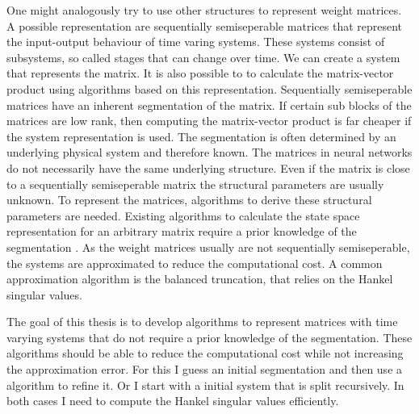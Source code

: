 \documentclass[doctype=mastersthesis,BCOR=15mm,biblatex]{ldvbook}%
\begin{document}
One might analogously try to use other structures to represent weight matrices.
A possible representation are sequentially semiseperable matrices that represent the input-output behaviour of time varing systems.
These systems consist of subsystems, so called stages that can change over time.
We can create a system that represents the matrix.
It is also possible to to calculate the matrix-vector product using algorithms based on this representation.
Sequentially semiseperable matrices have an inherent segmentation of the matrix.
If certain sub blocks of the matrices are low rank, then computing the matrix-vector product is far cheaper if the system representation is used.
The segmentation is often determined by an underlying physical system and therefore known. 
The matrices in neural networks do not necessarily have the same underlying structure.
Even if the matrix is close to a sequentially semiseperable matrix the structural parameters are usually unknown.
To represent the matrices, algorithms to derive these structural parameters are needed.
Existing algorithms to calculate the state space representation for an arbitrary matrix require a prior knowledge of the segmentation \cite{chandrasekaran_fast_2002}.
As the weight matrices usually are not sequentially semiseperable, the systems are approximated to reduce the computational cost.
A common approximation algorithm is the balanced truncation, that relies on the Hankel singular values.

The goal of this thesis is to develop algorithms to represent matrices with time varying systems that do not require a prior knowledge of the segmentation.
These algorithms should be able to reduce the computational cost while not increasing the approximation error.
For this I guess an initial segmentation and then use a algorithm to refine it.
Or I start with a initial system that is split recursively.
In both cases I need to compute the Hankel singular values efficiently.

\end{document}
